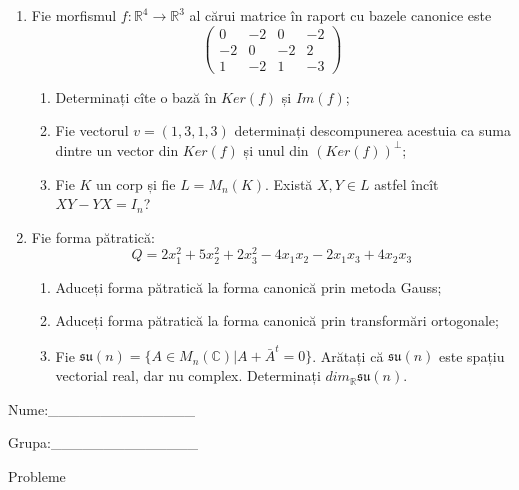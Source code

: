 \documentclass{article}
\begin{document}
\begin{enumerate}
 \item Fie morfismul $f:\mathbb{R}^4 \to \mathbb{R}^3$ al cărui matrice în raport cu bazele canonice este
$$\begin{pmatrix}
0&-2&0&-2\\
-2&0&-2&2\\
1&-2&1&-3
\end{pmatrix}$$

\begin{enumerate}
\item Determinați cîte o bază în $Ker(f)$ și $Im(f)$;
\item Fie vectorul $v=(1,3,1,3)$ determinați descompunerea acestuia ca suma dintre un vector din $Ker(f)$ și unul din $(Ker(f))^\perp$;
\item Fie $K$ un corp și fie $L=M_n(K)$. Există $X,Y \in L$ astfel încît $XY-YX=I_n$?  
\end{enumerate}
\item Fie forma pătratică:
$$Q= 2x_1^2+5x_2^2+2x_3^2-4x_1x_2-2x_1x_3+4x_2x_3$$

\begin{enumerate}
\item Aduceți forma pătratică la forma canonică prin metoda Gauss;
\item Aduceți forma pătratică la forma canonică prin transformări ortogonale;
\item Fie $\mathfrak{su}(n)=\{ A \in M_n(\mathbb{C}) | A+\bar{A}^t=0\}$. Arătați că $\mathfrak{su}(n)$ este spațiu vectorial real, dar nu complex.
Determinați $dim_{\mathbb{R}}\mathfrak{su}(n)$.
\end{enumerate}
\end{enumerate}
\newpage
\begin{flushright}
Nume:\_\_\_\_\_\_\_\_\_\_\_\_\_\_
 
 
Grupa:\_\_\_\_\_\_\_\_\_\_\_\_\_\_
\end{flushright}
\begin{center}
\vspace{2cm}
{\Large Probleme}
\vspace{2cm}
\end{center}
\end{document}
